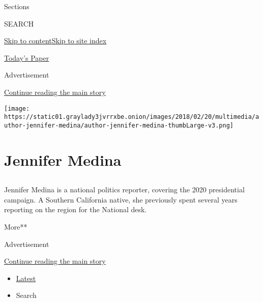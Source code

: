 Sections

SEARCH

\protect\hyperlink{site-content}{Skip to
content}\protect\hyperlink{site-index}{Skip to site index}

\href{https://myaccount.nytimes3xbfgragh.onion/auth/login?response_type=cookie\&client_id=vi}{}

\href{https://www.nytimes3xbfgragh.onion/section/todayspaper}{Today's
Paper}

Advertisement

\protect\hyperlink{after-top}{Continue reading the main story}

\texttt{[image: https://static01.graylady3jvrrxbe.onion/images/2018/02/20/multimedia/author-jennifer-medina/author-jennifer-medina-thumbLarge-v3.png]}

\hypertarget{jennifer-medina}{%
\section{Jennifer Medina}\label{jennifer-medina}}

\hypertarget{section}{%
\subsection{}\label{section}}

Jennifer Medina is a national politics reporter, covering the 2020
presidential campaign. A Southern California native, she previously
spent several years reporting on the region for the National desk.

More**

Advertisement

\protect\hyperlink{after-mid1}{Continue reading the main story}

\begin{itemize}
\tightlist
\item
  \protect\hyperlink{stream-panel}{Latest}
\item
  Search
\end{itemize}


